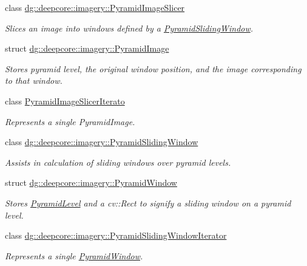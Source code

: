 \begin{DoxyCompactItemize}
class \hyperlink{classdg_1_1deepcore_1_1imagery_1_1_pyramid_image_slicer}{dg\+::deepcore\+::imagery\+::\+Pyramid\+Image\+Slicer}
\begin{DoxyCompactList}\small\item\em Slices an image into windows defined by a \hyperlink{classdg_1_1deepcore_1_1imagery_1_1_pyramid_sliding_window}{Pyramid\+Sliding\+Window}. \end{DoxyCompactList}\item 
struct \hyperlink{structdg_1_1deepcore_1_1imagery_1_1_pyramid_image}{dg\+::deepcore\+::imagery\+::\+Pyramid\+Image}
\begin{DoxyCompactList}\small\item\em Stores pyramid level, the original window position, and the image corresponding to that window. \end{DoxyCompactList}\item 
class \hyperlink{class_pyramid_image_slicer_iterato}{Pyramid\+Image\+Slicer\+Iterato}
\begin{DoxyCompactList}\small\item\em Represents a single Pyramid\+Image. \end{DoxyCompactList}\item 
class \hyperlink{classdg_1_1deepcore_1_1imagery_1_1_pyramid_sliding_window}{dg\+::deepcore\+::imagery\+::\+Pyramid\+Sliding\+Window}
\begin{DoxyCompactList}\small\item\em Assists in calculation of sliding windows over pyramid levels. \end{DoxyCompactList}\item 
struct \hyperlink{structdg_1_1deepcore_1_1imagery_1_1_pyramid_window}{dg\+::deepcore\+::imagery\+::\+Pyramid\+Window}
\begin{DoxyCompactList}\small\item\em Stores \hyperlink{structdg_1_1deepcore_1_1imagery_1_1_pyramid_level}{Pyramid\+Level} and a cv\+::\+Rect to signify a sliding window on a pyramid level. \end{DoxyCompactList}\item 
class \hyperlink{classdg_1_1deepcore_1_1imagery_1_1_pyramid_sliding_window_iterator}{dg\+::deepcore\+::imagery\+::\+Pyramid\+Sliding\+Window\+Iterator}
\begin{DoxyCompactList}\small\item\em Represents a single \hyperlink{structdg_1_1deepcore_1_1imagery_1_1_pyramid_window}{Pyramid\+Window}. \end{DoxyCompactList}\item 

\end{DoxyCompactItemize}

